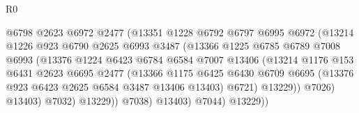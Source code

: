 \begin{lexlean}{R0}
\begin{coremodule}
                                    @6798
                                    @2623
                                    @6972
                                    @2477
                                    (@13351
                                      @1228
                                      @6792
                                      @6797
                                      @6995
                                      @6972
                                      (@13214
                                        @1226
                                        @923
                                        @6790
                                        @2625
                                        @6993
                                        @3487
                                        (@13366
                                          @1225
                                          @6785
                                          @6789
                                          @7008
                                          @6993
                                          (@13376
                                            @1224
                                            @6423
                                            @6784
                                            @6584
                                            @7007
                                            @13406
                                            (@13214
                                              @1176
                                              @153
                                              @6431
                                              @2623
                                              @6695
                                              @2477
                                              (@13366
                                                @1175
                                                @6425
                                                @6430
                                                @6709
                                                @6695
                                                (@13376 @923 @6423 @2625 @6584 @3487 @13406 @13403)
                                                @6721)
                                              @13229))
                                          @7026)
                                        @13403)
                                      @7032)
                                    @13229))
                                @7038)
                              @13403)
                            @7044)
                          @13229))

\end{coremodule}
\end{lexlean}
